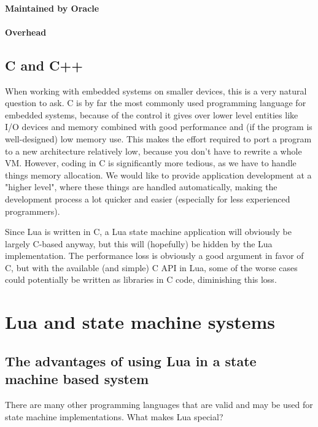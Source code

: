 \paragraph{Maintained by Oracle}

\paragraph{Overhead}

\subsection{C and C++}
\label{sec:lua_comp_c}
When working with embedded systems on smaller devices, this is a very natural question to ask. C is by far the most commonly used programming language for embedded systems, because of the control it gives over lower level entities like I/O devices and memory combined with good performance and (if the program is well-designed) low memory use. This makes the effort required to port a program to a new architecture relatively low, because you don't have to rewrite a whole VM. However, coding in C is significantly more tedious, as we have to handle things memory allocation. We would like to provide application development at a "higher level", where these things are handled automatically, making the development process a lot quicker and easier (especially for less experienced programmers).

Since Lua is written in C, a Lua state machine application will obviously be largely C-based anyway, but this will (hopefully) be hidden by the Lua implementation. The performance loss is obviously a good argument in favor of C, but with the available (and simple) C API in Lua, some of the worse cases could potentially be written as libraries in C code, diminishing this loss.

\section{Lua and state machine systems}
\label{sec:lua_and_state_machines}

\subsection{The advantages of using Lua in a state machine based system}
\label{sec:lua_advantages}

There are many other programming languages that are valid and may be used for state machine implementations. What makes Lua special?


